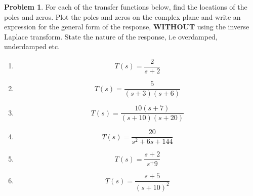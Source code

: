 \documentclass[10pt]{article}
\theoremstyle{definition}
\newtheorem{prob}{Problem}[section]
\newenvironment{subprob}%
{\renewcommand{\theenumi}{\alph{enumi}}\renewcommand{\labelenumi}{(\theenumi)}\begin{enumerate}}%
{\end{enumerate}}%
\begin{document}
\begin{prob}
    For each of the transfer functions below, find the locations of the poles and zeros.
    Plot the poles and zeros on the complex plane and write an expression for the general form of the response, \textbf{WITHOUT} using the inverse Laplace transform.
    State the nature of the response, i.e overdamped, underdamped etc.

    \begin{subprob}
        \item \[ T(s) = \frac{2}{s+2}\]
        \item \[ T(s) = \frac{5}{(s+3)(s+6)}\]
        \item \[ T(s) = \frac{10(s+7)}{(s+10)(s+20)}\]
        \item \[ T(s) = \frac{20}{s^2 + 6s + 144}\]
        \item \[ T(s) = \frac{s+2}{s^+9}\]
        \item \[ T(s) = \frac{s+5}{(s+10)^2}\]
    \end{subprob}
\end{prob}
\end{document}
